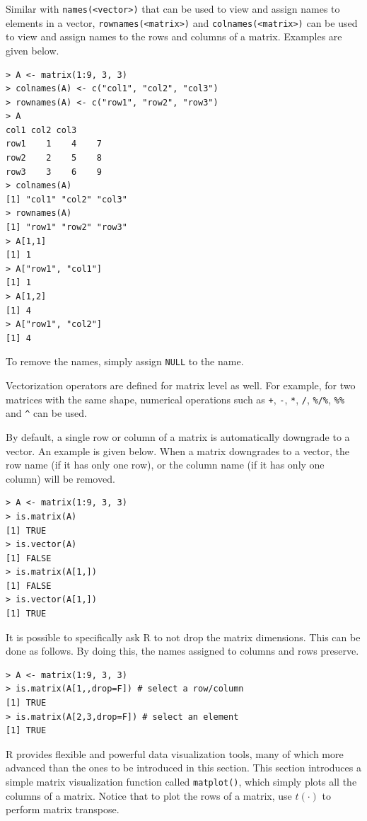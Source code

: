 Similar with \verb|names(<vector>)| that can be used to view and assign names to elements in a vector, \verb|rownames(<matrix>)| and \verb|colnames(<matrix>)| can be used to view and assign names to the rows and columns of a matrix. Examples are given below.
\begin{lstlisting}
> A <- matrix(1:9, 3, 3)
> colnames(A) <- c("col1", "col2", "col3")
> rownames(A) <- c("row1", "row2", "row3")
> A
col1 col2 col3
row1    1    4    7
row2    2    5    8
row3    3    6    9
> colnames(A)
[1] "col1" "col2" "col3"
> rownames(A)
[1] "row1" "row2" "row3"
> A[1,1]
[1] 1
> A["row1", "col1"]
[1] 1
> A[1,2]
[1] 4
> A["row1", "col2"]
[1] 4
\end{lstlisting}
To remove the names, simply assign \verb|NULL| to the name.

Vectorization operators are defined for matrix level as well. For example, for two matrices with the same shape, numerical operations such as  \verb|+|, \verb|-|, \verb|*|, \verb|/|, \verb|%/%|, \verb|%%| and \verb|^| can be used.

By default, a single row or column of a matrix is automatically downgrade to a vector. An example is given below. When a matrix downgrades to a vector, the row name (if it has only one row), or the column name (if it has only one column) will be removed.
\begin{lstlisting}
> A <- matrix(1:9, 3, 3)
> is.matrix(A)
[1] TRUE
> is.vector(A)
[1] FALSE
> is.matrix(A[1,])
[1] FALSE
> is.vector(A[1,])
[1] TRUE
\end{lstlisting}
It is possible to specifically ask R to not drop the matrix dimensions. This can be done as follows. By doing this, the names assigned to columns and rows preserve.
\begin{lstlisting}
> A <- matrix(1:9, 3, 3)
> is.matrix(A[1,,drop=F]) # select a row/column
[1] TRUE
> is.matrix(A[2,3,drop=F]) # select an element
[1] TRUE
\end{lstlisting}

R provides flexible and powerful data visualization tools, many of which more advanced than the ones to be introduced in this section. This section introduces a simple matrix visualization function called \verb|matplot()|, which simply plots all the columns of a matrix. Notice that to plot the rows of a matrix, use $t(\cdot)$ to perform matrix transpose.

